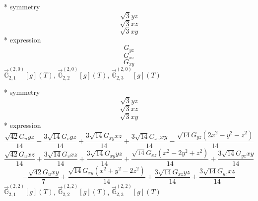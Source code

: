 \documentclass[fleqn,8pt]{jsarticle}
\begin{document}
\noindent\quad ** symmetry
\begin{dmath*}
\sqrt{3} y z
\end{dmath*}
\begin{dmath*}
\sqrt{3} x z
\end{dmath*}
\begin{dmath*}
\sqrt{3} x y
\end{dmath*}
\noindent\quad ** expression
\begin{dmath*}
G_{yz}
\end{dmath*}
\begin{dmath*}
G_{xz}
\end{dmath*}
\begin{dmath*}
G_{xy}
\end{dmath*}
\noindent\quad $\vec{\mathbb{G}}_{2,1}^{(2,0)}[g](T)$, $\vec{\mathbb{G}}_{2,2}^{(2,0)}[g](T)$, $\vec{\mathbb{G}}_{2,3}^{(2,0)}[g](T)$

\noindent\quad ** symmetry
\begin{dmath*}
\sqrt{3} y z
\end{dmath*}
\begin{dmath*}
\sqrt{3} x z
\end{dmath*}
\begin{dmath*}
\sqrt{3} x y
\end{dmath*}
\noindent\quad ** expression
\begin{dmath*}
\frac{\sqrt{42} G_{u} y z}{14} - \frac{3 \sqrt{14} G_{v} y z}{14} + \frac{3 \sqrt{14} G_{xy} x z}{14} + \frac{3 \sqrt{14} G_{xz} x y}{14} - \frac{\sqrt{14} G_{yz} \left(2 x^{2} - y^{2} - z^{2}\right)}{14}
\end{dmath*}
\begin{dmath*}
\frac{\sqrt{42} G_{u} x z}{14} + \frac{3 \sqrt{14} G_{v} x z}{14} + \frac{3 \sqrt{14} G_{xy} y z}{14} + \frac{\sqrt{14} G_{xz} \left(x^{2} - 2 y^{2} + z^{2}\right)}{14} + \frac{3 \sqrt{14} G_{yz} x y}{14}
\end{dmath*}
\begin{dmath*}
- \frac{\sqrt{42} G_{u} x y}{7} + \frac{\sqrt{14} G_{xy} \left(x^{2} + y^{2} - 2 z^{2}\right)}{14} + \frac{3 \sqrt{14} G_{xz} y z}{14} + \frac{3 \sqrt{14} G_{yz} x z}{14}
\end{dmath*}
\noindent\quad $\vec{\mathbb{G}}_{2,1}^{(2,2)}[g](T)$, $\vec{\mathbb{G}}_{2,2}^{(2,2)}[g](T)$, $\vec{\mathbb{G}}_{2,3}^{(2,2)}[g](T)$
\end{document}
